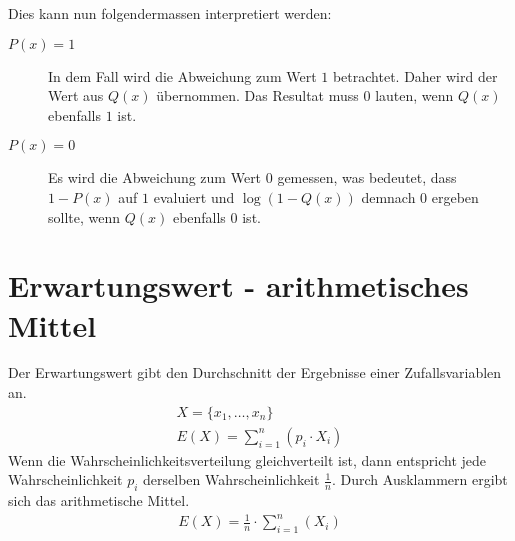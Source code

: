 Dies kann nun folgendermassen interpretiert werden:
\begin{description}
    \item[$P(x) = 1$] In dem Fall wird die Abweichung zum Wert $1$ betrachtet. Daher wird der Wert aus $Q(x)$ übernommen.
    Das Resultat muss $0$ lauten, wenn $Q(x)$ ebenfalls $1$ ist.
    \item[$P(x) = 0$] Es wird die Abweichung zum Wert $0$ gemessen, was bedeutet, dass $1 - P(x)$ auf $1$ evaluiert und
    $\log(1 - Q(x))$ demnach $0$ ergeben sollte, wenn $Q(x)$ ebenfalls $0$ ist.
\end{description}

\section{Erwartungswert - arithmetisches Mittel}\label{anhang:erwartungswert}
Der Erwartungswert gibt den Durchschnitt der Ergebnisse einer Zufallsvariablen an.\cite{wiki:erwartungswert}
\begin{align}
    X = \{x_1, \ldots, x_n\}\\
    E(X) = \sum_{i = 1}^{n} (p_i \cdot X_i)
\end{align}
Wenn die Wahrscheinlichkeitsverteilung gleichverteilt ist, dann entspricht jede
Wahrscheinlichkeit $p_i$ derselben Wahrscheinlichkeit $\frac{1}{n}$.
Durch Ausklammern ergibt sich das arithmetische Mittel.
\begin{align}
    E(X) = \frac{1}{n} \cdot \sum_{i = 1}^{n} (X_i)
\end{align}